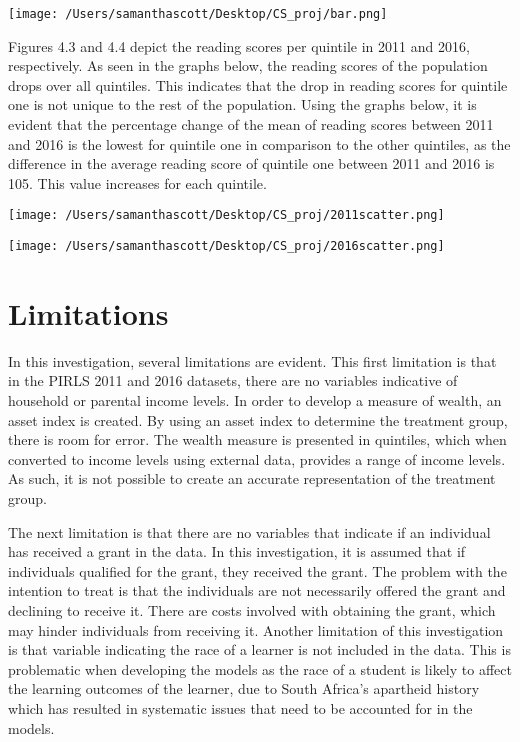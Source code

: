 \documentclass[11pt,preprint, authoryear]{elsarticle}
\let\origfigure\figure
\let\endorigfigure\endfigure
\renewenvironment{figure}[1][2] {
    \expandafter\origfigure\expandafter[H]
} {
    \endorigfigure
}
\numberwithin{equation}{section}
\numberwithin{figure}{section}
\numberwithin{table}{section}
\begin{document}
\begin{figure}
\centering
\texttt{[image: /Users/samanthascott/Desktop/CS\_proj/bar.png]}
\caption{Reading Scores: Untreated vs.Treated}
\end{figure}

Figures 4.3 and 4.4 depict the reading scores per quintile in 2011 and
2016, respectively. As seen in the graphs below, the reading scores of
the population drops over all quintiles. This indicates that the drop in
reading scores for quintile one is not unique to the rest of the
population. Using the graphs below, it is evident that the percentage
change of the mean of reading scores between 2011 and 2016 is the lowest
for quintile one in comparison to the other quintiles, as the difference
in the average reading score of quintile one between 2011 and 2016 is
105. This value increases for each quintile.

\begin{figure}
\centering
\texttt{[image: /Users/samanthascott/Desktop/CS\_proj/2011scatter.png]}
\caption{Reading Scores per Quintile in 2011}
\end{figure}

\begin{figure}
\centering
\texttt{[image: /Users/samanthascott/Desktop/CS\_proj/2016scatter.png]}
\caption{Reading Scores per Quintile in 2016}
\end{figure}

\hypertarget{limitations}{%
\section{Limitations}\label{limitations}}

In this investigation, several limitations are evident. This first
limitation is that in the PIRLS 2011 and 2016 datasets, there are no
variables indicative of household or parental income levels. In order to
develop a measure of wealth, an asset index is created. By using an
asset index to determine the treatment group, there is room for error.
The wealth measure is presented in quintiles, which when converted to
income levels using external data, provides a range of income levels. As
such, it is not possible to create an accurate representation of the
treatment group.

The next limitation is that there are no variables that indicate if an
individual has received a grant in the data. In this investigation, it
is assumed that if individuals qualified for the grant, they received
the grant. The problem with the intention to treat is that the
individuals are not necessarily offered the grant and declining to
receive it. There are costs involved with obtaining the grant, which may
hinder individuals from receiving it. Another limitation of this
investigation is that variable indicating the race of a learner is not
included in the data. This is problematic when developing the models as
the race of a student is likely to affect the learning outcomes of the
learner, due to South Africa's apartheid history which has resulted in
systematic issues that need to be accounted for in the models.
\end{document}
